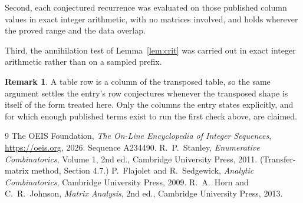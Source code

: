 \documentclass[11pt,a4paper]{article}
\theoremstyle{plain}
\theoremstyle{definition}
\newtheorem{remark}[theorem]{Remark}
\begin{document}
Second, each conjectured recurrence was evaluated on those published column values in exact
integer arithmetic, with no matrices involved, and holds wherever the proved range and the
data overlap.

Third, the annihilation test of Lemma~\ref{lem:crit} was carried out in exact integer
arithmetic rather than on a sampled prefix.

\begin{remark}
A table row is a column of the transposed table, so the same argument settles the entry's row
conjectures whenever the transposed shape is itself of the form treated here. Only the columns
the entry states explicitly, and for which enough published terms exist to run the first check
above, are claimed.
\end{remark}

\begin{thebibliography}{9}
 The OEIS Foundation, \emph{The On-Line Encyclopedia of Integer
Sequences}, \url{https://oeis.org}, 2026. Sequence A234490.
 R.~P.~Stanley, \emph{Enumerative Combinatorics}, Volume 1, 2nd ed.,
Cambridge University Press, 2011. (Transfer-matrix method, Section 4.7.)
 P.~Flajolet and R.~Sedgewick, \emph{Analytic Combinatorics}, Cambridge
University Press, 2009.
 R.~A.~Horn and C.~R.~Johnson, \emph{Matrix Analysis}, 2nd ed., Cambridge
University Press, 2013.
\end{thebibliography}
\end{document}
